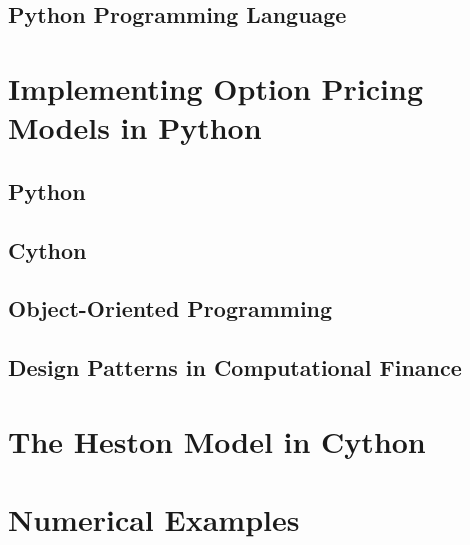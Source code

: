 \documentclass[11pt,]{article}
\begin{document}
\subsection{Python Programming
Language}\label{python-programming-language}

\section{Implementing Option Pricing Models in
Python}\label{implementing-option-pricing-models-in-python}

\subsection{Python}\label{python}

\subsection{Cython}\label{cython}

\subsection{Object-Oriented
Programming}\label{object-oriented-programming}

\subsection{Design Patterns in Computational
Finance}\label{design-patterns-in-computational-finance}

\section{The Heston Model in Cython}\label{the-heston-model-in-cython}

\section{Numerical Examples}\label{numerical-examples}

\newpage
\singlespacing 

\end{document}
